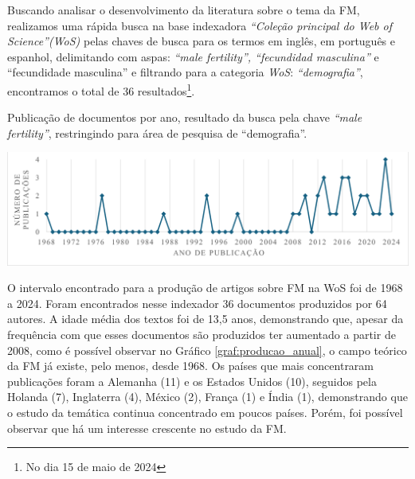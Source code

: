 Buscando analisar o desenvolvimento da literatura sobre o tema da FM, realizamos uma rápida busca na base indexadora \textit{“Coleção principal do Web of Science”(WoS)} pelas chaves de busca para os termos em inglês, em português e espanhol, delimitando com aspas: \textit{“male fertility”, “fecundidad masculina”} e “fecundidade masculina” e filtrando para a categoria \textit{WoS}: \textit{“demografia”}, encontramos o total de 36 resultados\footnote{No dia 15 de maio de 2024}.

\begin{grafico}
    \centering
    \caption{Publicação de documentos por ano, resultado da busca pela chave \textit{“male fertility”}, restringindo para área de pesquisa de “demografia”.}
    \includegraphics[scale=0.75]{imagens/grafico1.png}
    \label{graf:producao_anual}
\end{grafico}

O intervalo encontrado para a produção de artigos sobre FM na WoS foi de 1968 a 2024. Foram encontrados nesse indexador 36 documentos produzidos por 64 autores. A idade média dos textos foi de 13,5 anos, demonstrando que, apesar da frequência com que esses documentos são produzidos ter aumentado a partir de 2008, como é possível observar no Gráfico \ref{graf:producao_anual}, o campo teórico da FM já existe, pelo menos, desde 1968. Os países que mais concentraram publicações foram a Alemanha (11) e os Estados Unidos (10), seguidos pela Holanda (7), Inglaterra (4), México (2), França (1) e Índia (1), demonstrando que o estudo da temática continua concentrado em poucos países. Porém, foi possível observar que há um interesse crescente no estudo da FM.

